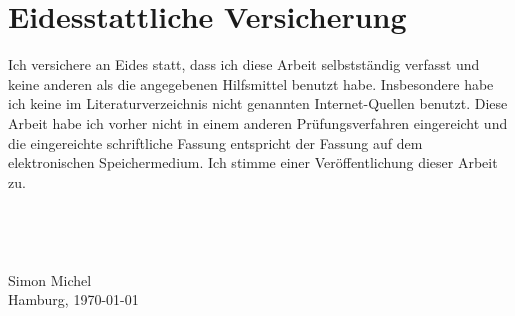 \documentclass[11pt,twoside,a4paper,fleqn,x11names]{report}
\numberwithin{equation}{chapter}
\numberwithin{figure}{chapter}
\numberwithin{table}{chapter}
\begin{document}
\chapter{Eidesstattliche Versicherung}
Ich versichere an Eides statt, dass ich diese Arbeit selbstständig verfasst und keine anderen als die angegebenen Hilfsmittel benutzt habe. Insbesondere habe ich keine im Literaturverzeichnis nicht genannten Internet-Quellen benutzt. Diese Arbeit habe ich vorher nicht in einem anderen Prüfungsverfahren eingereicht und die eingereichte schriftliche Fassung entspricht der Fassung auf dem elektronischen Speichermedium. Ich stimme einer Veröffentlichung dieser Arbeit zu.
\\
\\
\\
\\
\\
Simon Michel\\
Hamburg, \today
\end{document}
